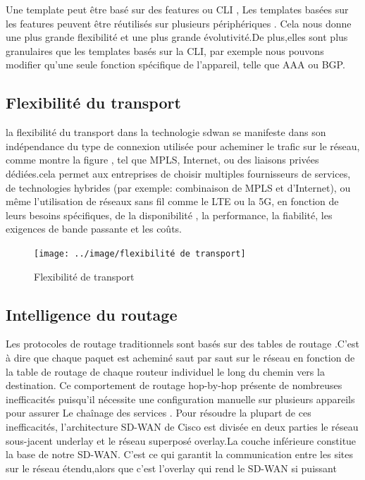 Une template peut être basé sur des features ou CLI , Les templates basées sur  les features peuvent être réutilisés sur plusieurs périphériques . Cela nous donne une plus grande flexibilité et une plus grande évolutivité.De plus,elles sont plus granulaires que les templates basés sur la CLI, par exemple nous pouvons  modifier qu'une seule fonction spécifique de l'appareil, telle que AAA ou BGP.
\subsection{Flexibilité du transport  }

la flexibilité du transport dans la technologie sdwan se manifeste dans son indépendance du type de connexion utilisée pour acheminer le trafic sur le réseau, comme montre la figure   , tel que MPLS, Internet, ou des liaisons privées dédiées.cela permet aux entreprises de choisir multiples fournisseurs de services, de technologies hybrides (par exemple: combinaison de MPLS et d'Internet), ou même l'utilisation de réseaux sans fil comme le LTE ou la 5G, en fonction de leurs besoins spécifiques, de la disponibilité , la performance, la fiabilité, les exigences de bande passante et les coûts.
\begin{figure} [H]
	\begin{center}
		\centering
		\hspace*{-0.5cm}
		\texttt{[image: ../image/flexibilité de transport]}
	\end{center}
	\caption{Flexibilité de transport}
\end{figure} 
\subsection{Intelligence du routage   }

Les protocoles de routage traditionnels sont basés sur des tables de routage .C’est à dire  que chaque paquet est acheminé saut par saut sur le réseau en fonction de la table de routage de chaque routeur individuel le long du chemin vers la destination. Ce comportement de routage hop-by-hop présente de nombreuses inefficacités  puisqu'il nécessite une configuration manuelle sur plusieurs appareils pour assurer Le chaînage des services .
Pour résoudre la plupart de ces inefficacités, l'architecture SD-WAN de Cisco est divisée en deux parties le réseau sous-jacent underlay et le réseau superposé overlay.La couche inférieure constitue la base de notre SD-WAN. C'est ce qui garantit la communication entre les sites sur le réseau étendu,alors que  c'est l'overlay qui rend le SD-WAN si puissant 



